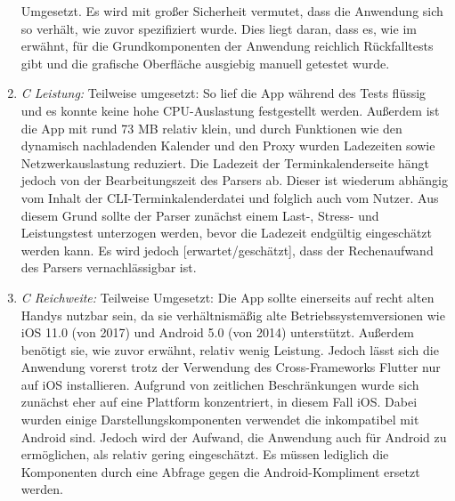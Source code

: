 \begin{enumerate}
		Umgesetzt. Es wird mit großer Sicherheit vermutet, dass die Anwendung sich so verhält, wie zuvor spezifiziert wurde. Dies liegt daran, dass es, wie im  erwähnt, für die Grundkomponenten der Anwendung reichlich Rückfalltests gibt und die grafische Oberfläche ausgiebig manuell getestet wurde.%
	\item \textit{C Leistung:}\newline%
		Teilweise umgesetzt: %
		So lief die App während des Tests flüssig und es konnte keine hohe CPU-Auslastung festgestellt werden. %
		Außerdem ist die App mit rund 73 MB relativ klein, und durch Funktionen wie den dynamisch nachladenden Kalender und den Proxy wurden Ladezeiten sowie Netzwerkauslastung reduziert. %
		Die Ladezeit der Terminkalenderseite hängt jedoch von der Bearbeitungszeit des Parsers ab. Dieser ist wiederum abhängig vom Inhalt der CLI-Terminkalenderdatei und folglich auch vom Nutzer. Aus diesem Grund sollte der Parser zunächst einem Last-, Stress- und Leistungstest unterzogen werden, bevor die Ladezeit endgültig eingeschätzt werden kann. Es wird jedoch [erwartet/geschätzt], dass der Rechenaufwand des Parsers vernachlässigbar ist.%
	\item \textit{C Reichweite:}\newline%
		Teilweise Umgesetzt: %
		Die App sollte einerseits auf recht alten Handys nutzbar sein, da sie verhältnismäßig alte Betriebssystemversionen wie iOS 11.0 (von 2017) und Android 5.0 (von 2014) unterstützt. Außerdem benötigt sie, wie zuvor erwähnt, relativ wenig Leistung. %
		Jedoch lässt sich die Anwendung vorerst trotz der Verwendung des Cross-Frameworks Flutter nur auf iOS installieren. Aufgrund von zeitlichen Beschränkungen wurde sich zunächst eher auf eine Plattform konzentriert, in diesem Fall iOS. Dabei wurden einige Darstellungskomponenten verwendet die inkompatibel mit Android sind. Jedoch wird der Aufwand, die Anwendung auch für Android zu ermöglichen, als relativ gering eingeschätzt. Es müssen lediglich die Komponenten durch eine Abfrage gegen die Android-Kompliment ersetzt werden.%
\end{enumerate}